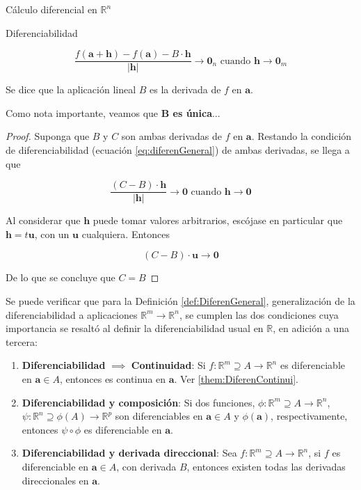 \begin{chapter}{Cálculo diferencial en $\mathbb{R}^n$}
\begin{section}{Diferenciabilidad}
\begin{defn}
\begin{equation}
\label{eq:diferenGeneral}
    \frac{f(\textbf{a}+\textbf{h})-f(\textbf{a}) - B \cdot \textbf{h}}{|\textbf{h}|} \rightarrow \textbf{0}_n \text{ cuando } \textbf{h} \rightarrow \textbf{0}_m
\end{equation}

Se dice que la aplicación lineal $B$ es la derivada de $f$ en $\textbf{a}$.
\end{defn}

Como nota importante, veamos que \textbf{B es única}...

\begin{proof}

Suponga que $B$ y $C$ son ambas derivadas de $f$ en $\textbf{a}$. Restando la condición de diferenciabilidad (ecuación \ref{eq:diferenGeneral}) de ambas derivadas, se llega a que

\begin{equation*}
    \frac{(C-B)\cdot \textbf{h}}{|\textbf{h}|} \rightarrow \textbf{0} \text{ cuando } \textbf{h} \rightarrow \textbf{0}
\end{equation*}

Al considerar que $\textbf{h}$ puede tomar valores arbitrarios, escójase en particular que $\textbf{h} = t \textbf{u}$, con un $\textbf{u}$ cualquiera. Entonces

\begin{equation*}
    {(C-B)\cdot \textbf{u}} \rightarrow \textbf{0}
\end{equation*}

De lo que se concluye que $C=B$
\end{proof}

Se puede verificar que para la Definición \ref{def:DiferenGeneral}, generalización de la diferenciabilidad a aplicaciones $\mathbb{R}^m \longrightarrow \mathbb{R}^n$, se cumplen las dos condiciones cuya importancia se resaltó al definir la diferenciabilidad usual en $\mathbb{R}$, en adición a una tercera:

\begin{enumerate}
    \item \textbf{Diferenciabilidad} $\implies$ \textbf{Continuidad}: Si $f: \mathbb{R}^m \supseteq A \longrightarrow \mathbb{R}^n$ es diferenciable en $\textbf{a} \in A$, entonces es continua en $\textbf{a}$. Ver \cref{them:DiferenContinui}.
    \item \textbf{Diferenciabilidad y composición}: Si dos funciones, $\phi: \mathbb{R}^m \supseteq A \longrightarrow \mathbb{R}^n$, $\psi: \mathbb{R}^n \supseteq \phi(A) \longrightarrow \mathbb{R}^p$ son diferenciables en $\textbf{a} \in A$ y ${\phi}(\textbf{a})$, respectivamente, entonces $\psi \circ \phi$ es diferenciable en $\textbf{a}$.
    \item \textbf{Diferenciabilidad y derivada direccional}: Sea $f: \mathbb{R}^m \supseteq A \longrightarrow \mathbb{R}^n$, si $f$ es diferenciable en $\textbf{a} \in A$, con derivada $B$, entonces existen todas las derivadas direccionales en $\textbf{a}$.
\end{enumerate}


\end{section}
\end{chapter}
